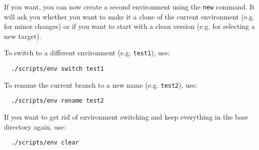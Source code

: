 If you want, you can now create a second environment using the \texttt{new} command.
It will ask you whether you want to make it a clone of the current environment (e.g.
for minor changes) or if you want to start with a clean version (e.g. for selecting
a new target).

To switch to a different environment (e.g. \texttt{test1}), use:
\begin{Verbatim}
  ./scripts/env switch test1
\end{Verbatim}

To rename the current branch to a new name (e.g. \texttt{test2}), use:
\begin{Verbatim}
  ./scripts/env rename test2
\end{Verbatim}

If you want to get rid of environment switching and keep everything in the base directory
again, use:
\begin{Verbatim}
  ./scripts/env clear
\end{Verbatim}

